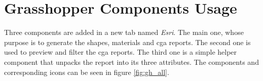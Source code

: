 \section{Grasshopper Components Usage}

Three components are added in a new tab named \textit{Esri}. The main one, whose purpose is to generate the shapes, materials and cga reports. The second one is used to preview and filter the cga reports. The third one is a simple helper component that unpacks the report into its three attributes. The components and corresponding icons can be seen in figure \ref{fig:gh_all}.

\newcommand{\subf}[2]{%
  {\small\begin{tabular}[t]{@{}c@{}}
   \mbox{}\\[-\ht\strutbox]
   #1\\#2
   \end{tabular}}%
}

